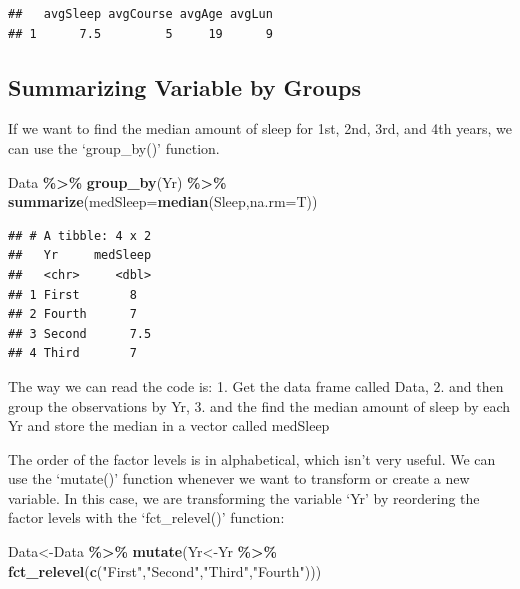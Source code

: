 \documentclass[
  openany]{book}
\newenvironment{Shaded}{\begin{snugshade}}{\end{snugshade}}
\newcommand{\AttributeTok}[1]{\textcolor[rgb]{0.13,0.29,0.53}{#1}}
\newcommand{\FunctionTok}[1]{\textcolor[rgb]{0.13,0.29,0.53}{\textbf{#1}}}
\newcommand{\NormalTok}[1]{#1}
\newcommand{\OtherTok}[1]{\textcolor[rgb]{0.56,0.35,0.01}{#1}}
\newcommand{\SpecialCharTok}[1]{\textcolor[rgb]{0.81,0.36,0.00}{\textbf{#1}}}
\newcommand{\StringTok}[1]{\textcolor[rgb]{0.31,0.60,0.02}{#1}}
\begin{document}
\begin{verbatim}
##   avgSleep avgCourse avgAge avgLun
## 1      7.5         5     19      9
\end{verbatim}

\subsection{Summarizing Variable by Groups}\label{summarizing-variable-by-groups-1}

If we want to find the median amount of sleep for 1st, 2nd, 3rd, and 4th years, we can use the `group\_by()' function.

\begin{Shaded}
\begin{Highlighting}[]
\NormalTok{Data }\SpecialCharTok{\%\textgreater{}\%} 
  \FunctionTok{group\_by}\NormalTok{(Yr) }\SpecialCharTok{\%\textgreater{}\%} 
  \FunctionTok{summarize}\NormalTok{(}\AttributeTok{medSleep=}\FunctionTok{median}\NormalTok{(Sleep,}\AttributeTok{na.rm=}\NormalTok{T))}
\end{Highlighting}
\end{Shaded}

\begin{verbatim}
## # A tibble: 4 x 2
##   Yr     medSleep
##   <chr>     <dbl>
## 1 First       8  
## 2 Fourth      7  
## 3 Second      7.5
## 4 Third       7
\end{verbatim}

The way we can read the code is:
1. Get the data frame called Data,
2. and then group the observations by Yr,
3. and the find the median amount of sleep by each Yr and store the median in a vector called medSleep

The order of the factor levels is in alphabetical, which isn't very useful. We can use the `mutate()' function whenever we want to transform or create a new variable. In this case, we are transforming the variable `Yr' by reordering the factor levels with the `fct\_relevel()' function:

\begin{Shaded}
\begin{Highlighting}[]
\NormalTok{Data}\OtherTok{\textless{}{-}}\NormalTok{Data }\SpecialCharTok{\%\textgreater{}\%} 
  \FunctionTok{mutate}\NormalTok{(Yr}\OtherTok{\textless{}{-}}\NormalTok{Yr }\SpecialCharTok{\%\textgreater{}\%} 
           \FunctionTok{fct\_relevel}\NormalTok{(}\FunctionTok{c}\NormalTok{(}\StringTok{"First"}\NormalTok{,}\StringTok{"Second"}\NormalTok{,}\StringTok{"Third"}\NormalTok{,}\StringTok{"Fourth"}\NormalTok{)))}
\end{Highlighting}
\end{Shaded}
\end{document}
